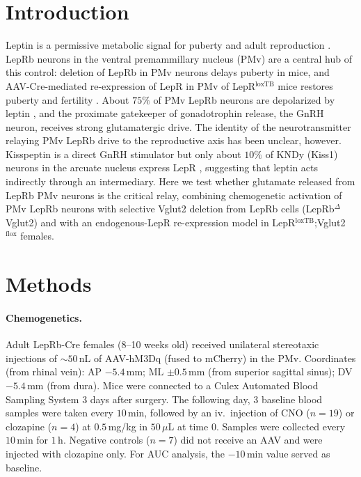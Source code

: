 \documentclass[11pt]{article}
\begin{document}
\section{Introduction}

Leptin is a permissive metabolic signal for puberty and adult reproduction \cite{elias2010review,hill2018,manfredilozano2016,cravo2011,kauffman2007kndy}. LepRb neurons in the ventral premammillary nucleus (PMv) are a central hub of this control: deletion of LepRb in PMv neurons delays puberty in mice, and AAV-Cre-mediated re-expression of LepR in PMv of LepR$^{\mathrm{loxTB}}$ mice restores puberty and fertility \cite{donato2011,mahany2018}. About $75\%$ of PMv LepRb neurons are depolarized by leptin \cite{williams2011}, and the proximate gatekeeper of gonadotrophin release, the GnRH neuron, receives strong glutamatergic drive. The identity of the neurotransmitter relaying PMv LepRb drive to the reproductive axis has been unclear, however. Kisspeptin is a direct GnRH stimulator but only about $10\%$ of KNDy (Kiss1) neurons in the arcuate nucleus express LepR \cite{cravo2013,donato2011,louis2011,true2011}, suggesting that leptin acts indirectly through an intermediary. Here we test whether glutamate released from LepRb PMv neurons is the critical relay, combining chemogenetic activation of PMv LepRb neurons with selective Vglut2 deletion from LepRb cells (LepRb$^{\Delta}$Vglut2) and with an endogenous-LepR re-expression model in LepR$^{\mathrm{loxTB}}$;Vglut2$^{\mathrm{flox}}$ females.

\section{Methods}

\paragraph{Chemogenetics.} Adult LepRb-Cre females (8--10 weeks old) received unilateral stereotaxic injections of $\sim 50$\,nL of AAV-hM3Dq (fused to mCherry) in the PMv. Coordinates (from rhinal vein): AP $-5.4$\,mm; ML $\pm 0.5$\,mm (from superior sagittal sinus); DV $-5.4$\,mm (from dura). Mice were connected to a Culex Automated Blood Sampling System $3$ days after surgery. The following day, $3$ baseline blood samples were taken every $10$\,min, followed by an iv.\ injection of CNO ($n=19$) or clozapine ($n=4$) at $0.5$\,mg/kg in $50\,\mu$L at time $0$. Samples were collected every $10$\,min for $1$\,h. Negative controls ($n=7$) did not receive an AAV and were injected with clozapine only. For AUC analysis, the $-10$\,min value served as baseline.
\end{document}
